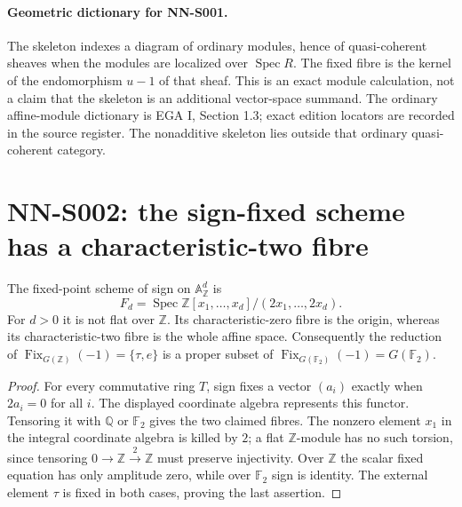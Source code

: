 \paragraph{Geometric dictionary for NN-S001.}
The skeleton indexes a diagram of ordinary modules, hence of
quasi-coherent sheaves when the modules are localized over $\operatorname{Spec}R$.
The fixed fibre is the kernel of the endomorphism $u-1$ of that sheaf.
This is an exact module calculation, not a claim that the skeleton is
an additional vector-space summand. The ordinary affine-module
dictionary is EGA I, Section 1.3; exact edition locators are recorded
in the source register. The nonadditive skeleton lies outside that
ordinary quasi-coherent category.

\section{NN-S002: the sign-fixed scheme has a characteristic-two fibre}
\label{sec:NN-S002}

\begin{theorem}[NN-S002]
The fixed-point scheme of sign on $\mathbb A^d_{\mathbb Z}$ is
\[
 F_d=\operatorname{Spec}\mathbb Z[x_1,\ldots,x_d]/(2x_1,\ldots,2x_d).
\]
For $d>0$ it is not flat over $\mathbb Z$. Its characteristic-zero
fibre is the origin, whereas its characteristic-two fibre is the
whole affine space. Consequently the reduction of
$\operatorname{Fix}_{G(\mathbb Z)}(-1)=\{\tau,e\}$ is a proper subset
of $\operatorname{Fix}_{G(\mathbb F_2)}(-1)=G(\mathbb F_2)$.
\end{theorem}

\begin{proof}
For every commutative ring $T$, sign fixes a vector $(a_i)$ exactly
when $2a_i=0$ for all $i$. The displayed coordinate algebra represents
this functor. Tensoring it with $\mathbb Q$ or $\mathbb F_2$ gives
the two claimed fibres. The nonzero element $x_1$ in the integral
coordinate algebra is killed by $2$; a flat $\mathbb Z$-module has
no such torsion, since tensoring $0\to\mathbb Z\xrightarrow{2}\mathbb Z$
must preserve injectivity. Over $\mathbb Z$ the scalar fixed equation
has only amplitude zero, while over $\mathbb F_2$ sign is identity.
The external element $\tau$ is fixed in both cases, proving the
last assertion.
\end{proof}

